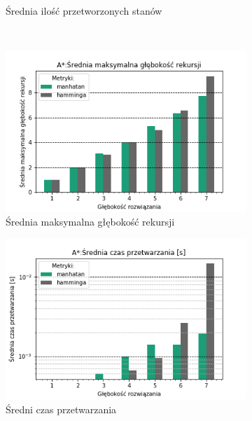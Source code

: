\documentclass{classrep}
\begin{document}
\begin{figure}[H]
\begin{subfigure}[t]{0.45\textwidth}
        \caption{Średnia ilość przetworzonych stanów}
        \label{ASTR:processed}
    \end{subfigure}
    \qquad
    ~ %
    \begin{subfigure}[t]{0.45\textwidth}
        \includegraphics[width=\textwidth]{charts/ASTR_recursed.png}
        \caption{Średnia maksymalna głębokość rekursji}
        \label{ASTR:rescursed}
    \end{subfigure}
    \begin{subfigure}[t]{0.45\textwidth}
        \includegraphics[width=\textwidth]{charts/ASTR_time.png}
        \caption{Średni czas przetwarzania}
        \label{ASTR:time}
    \end{subfigure}
    \begin{subfigure}[t]{0.45\textwidth}

\end{subfigure}
\end{figure}
\end{document}
